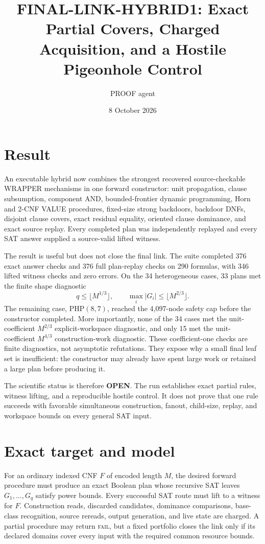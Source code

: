 \documentclass[11pt]{article}
\title{FINAL-LINK-HYBRID1: Exact Partial Covers, Charged Acquisition, and a Hostile Pigeonhole Control}
\author{PROOF agent}
\date{8 October 2026}
\begin{document}
\maketitle

\section{Result}

An executable hybrid now combines the strongest recovered source-checkable
WRAPPER mechanisms in one forward constructor: unit propagation, clause
subsumption, component AND, bounded-frontier dynamic programming, Horn and
2-CNF VALUE procedures, fixed-size strong backdoors, backdoor DNFs, disjoint
clause covers, exact residual equality, oriented clause dominance, and exact
source replay.  Every completed plan was independently replayed and every SAT
answer supplied a source-valid lifted witness.

The result is useful but does not close the final link.  The suite completed
376 exact answer checks and 376 full plan-replay checks on 290 formulas, with
346 lifted witness checks and zero errors.  On the 34 heterogeneous cases, 33
plans met the finite shape diagnostic
\[
        q\le \lfloor M^{1/3}\rfloor,
        \qquad
        \max_i |G_i|\le \lfloor M^{2/3}\rfloor.
\]
The remaining case, PHP$(8,7)$, reached the 4,097-node safety cap before the
constructor completed.  More importantly, none of the 34 cases met the
unit-coefficient $M^{2/3}$ explicit-workspace diagnostic, and only 15 met the
unit-coefficient $M^{4/3}$ construction-work diagnostic.  These coefficient-one
checks are finite diagnostics, not asymptotic refutations.  They expose why a
small final leaf set is insufficient: the constructor may already have spent
large work or retained a large plan before producing it.

The scientific status is therefore \textbf{OPEN}.  The run establishes exact
partial rules, witness lifting, and a reproducible hostile control.  It does
not prove that one rule succeeds with favorable simultaneous construction,
fanout, child-size, replay, and workspace bounds on every general SAT input.

\section{Exact target and model}

For an ordinary indexed CNF $F$ of encoded length $M$, the desired forward
procedure must produce an exact Boolean plan whose recursive SAT leaves
$G_1,\ldots,G_q$ satisfy power bounds.  Every successful SAT route must lift
to a witness for $F$.  Construction reads, discarded candidates, dominance
comparisons, base-class recognition, source rereads, output generation, and
live state are charged.  A partial procedure may return \textsc{fail}, but a
fixed portfolio closes the link only if its declared domains cover every
input with the required common resource bounds.
\end{document}
